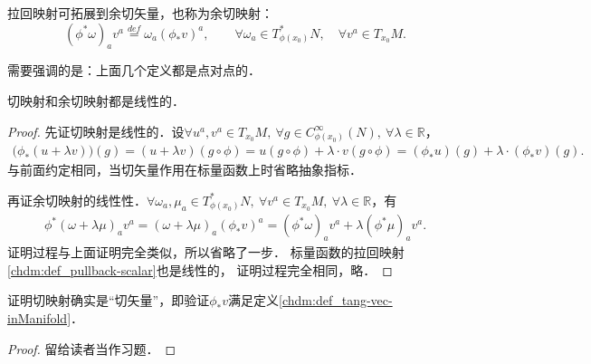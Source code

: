 \begin{definition}\label{chdm:def_pullback-1form}
    {\heiti 拉回映射}可拓展到余切矢量，也称为{\heiti 余切映射}：
    \begin{equation}
        (\phi^{*}\omega)_a v^a \overset{def}{=} \omega_a (\phi_{*}v)^a ,
        \qquad \forall \omega_a \in T^{*}_{\phi(x_0)}N,\quad \forall v^a \in T_{x_0}M .
    \end{equation}
\end{definition}
需要强调的是：上面几个定义都是点对点的．


\begin{proposition}
    切映射和余切映射都是线性的．
\end{proposition}
\begin{proof}
    先证切映射是线性的．设$\forall u^a,v^a \in T_{x_0}M,\  \forall g\in C^\infty_{\phi(x_0)}(N),\ 
    \forall \lambda \in \mathbb{R}$，
    \setlength{\mathindent}{0em}
    \begin{align*}
        \bigl(\phi_{*}(u+ \lambda v) \bigr)(g)= (u+ \lambda v)(g\circ \phi)
        =u(g\circ \phi) +\lambda \cdot v (g\circ \phi)
        =(\phi_{*} u) (g) + \lambda \cdot (\phi_{*}v)(g) .
    \end{align*}\setlength{\mathindent}{2em}
    与前面约定相同，当切矢量作用在标量函数上时省略抽象指标．
    
    再证余切映射的线性性．$\forall \omega_a ,\mu_a \in T^{*}_{\phi(x_0)}N,\ 
    \forall v^a\in T_{x_0}M, \ \forall \lambda \in \mathbb{R}$，有
    \begin{align*}
         \phi^{*} (\omega+\lambda \mu )_a v^a  = 
        (\omega+\lambda \mu )_a (\phi_{*}v)^a 
        =(\phi^{*}\omega)_a v^a + \lambda(\phi^{*}\mu)_a v^a .
    \end{align*}
    证明过程与上面证明完全类似，所以省略了一步．
    标量函数的拉回映射\ref{chdm:def_pullback-scalar}也是线性的，
    证明过程完全相同，略．
\end{proof}

\begin{proposition}
    证明切映射确实是“切矢量”，即验证$\phi_{*}v$满足定义\ref{chdm:def_tang-vec-inManifold}．
\end{proposition}
\begin{proof}
    留给读者当作习题．
\end{proof}

